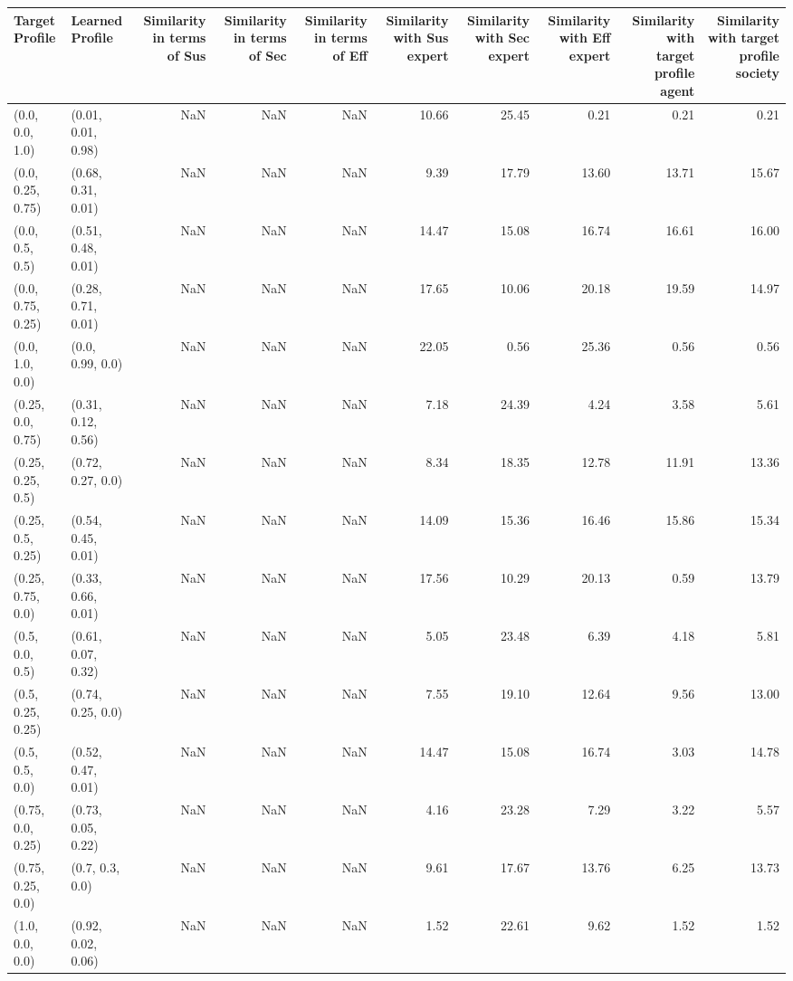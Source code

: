 \begin{tabular}{llrrrrrrrr}
\toprule
Target Profile & Learned Profile & Similarity in terms of Sus & Similarity in terms of Sec & Similarity in terms of Eff & Similarity with Sus expert & Similarity with Sec expert & Similarity with Eff expert & Similarity with target profile agent & Similarity with target profile society \\
\midrule
(0.0, 0.0, 1.0) & (0.01, 0.01, 0.98) & NaN & NaN & NaN & 10.66 & 25.45 & 0.21 & 0.21 & 0.21 \\
(0.0, 0.25, 0.75) & (0.68, 0.31, 0.01) & NaN & NaN & NaN & 9.39 & 17.79 & 13.60 & 13.71 & 15.67 \\
(0.0, 0.5, 0.5) & (0.51, 0.48, 0.01) & NaN & NaN & NaN & 14.47 & 15.08 & 16.74 & 16.61 & 16.00 \\
(0.0, 0.75, 0.25) & (0.28, 0.71, 0.01) & NaN & NaN & NaN & 17.65 & 10.06 & 20.18 & 19.59 & 14.97 \\
(0.0, 1.0, 0.0) & (0.0, 0.99, 0.0) & NaN & NaN & NaN & 22.05 & 0.56 & 25.36 & 0.56 & 0.56 \\
(0.25, 0.0, 0.75) & (0.31, 0.12, 0.56) & NaN & NaN & NaN & 7.18 & 24.39 & 4.24 & 3.58 & 5.61 \\
(0.25, 0.25, 0.5) & (0.72, 0.27, 0.0) & NaN & NaN & NaN & 8.34 & 18.35 & 12.78 & 11.91 & 13.36 \\
(0.25, 0.5, 0.25) & (0.54, 0.45, 0.01) & NaN & NaN & NaN & 14.09 & 15.36 & 16.46 & 15.86 & 15.34 \\
(0.25, 0.75, 0.0) & (0.33, 0.66, 0.01) & NaN & NaN & NaN & 17.56 & 10.29 & 20.13 & 0.59 & 13.79 \\
(0.5, 0.0, 0.5) & (0.61, 0.07, 0.32) & NaN & NaN & NaN & 5.05 & 23.48 & 6.39 & 4.18 & 5.81 \\
(0.5, 0.25, 0.25) & (0.74, 0.25, 0.0) & NaN & NaN & NaN & 7.55 & 19.10 & 12.64 & 9.56 & 13.00 \\
(0.5, 0.5, 0.0) & (0.52, 0.47, 0.01) & NaN & NaN & NaN & 14.47 & 15.08 & 16.74 & 3.03 & 14.78 \\
(0.75, 0.0, 0.25) & (0.73, 0.05, 0.22) & NaN & NaN & NaN & 4.16 & 23.28 & 7.29 & 3.22 & 5.57 \\
(0.75, 0.25, 0.0) & (0.7, 0.3, 0.0) & NaN & NaN & NaN & 9.61 & 17.67 & 13.76 & 6.25 & 13.73 \\
(1.0, 0.0, 0.0) & (0.92, 0.02, 0.06) & NaN & NaN & NaN & 1.52 & 22.61 & 9.62 & 1.52 & 1.52 \\
\bottomrule
\end{tabular}
